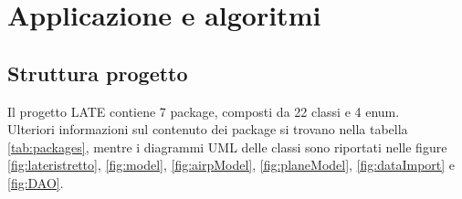 \documentclass[a4paper, 12pt]{article}
\begin{document}
\newpage


\section{Applicazione e algoritmi}

	\subsection{Struttura progetto}

Il progetto LATE contiene 7 package, composti da 22 classi e 4 enum.\\ Ulteriori informazioni sul contenuto dei package si trovano nella tabella \ref{tab:packages}, mentre i diagrammi UML delle classi sono riportati nelle figure \ref{fig:lateristretto}, \ref{fig:model}, \ref{fig:airpModel}, \ref{fig:planeModel}, \ref{fig:dataImport} e \ref{fig:DAO}.

\begin{table}[H]
\centering
\caption{Schema dei package}
\label{tab:packages}
\end{table}
\end{document}

